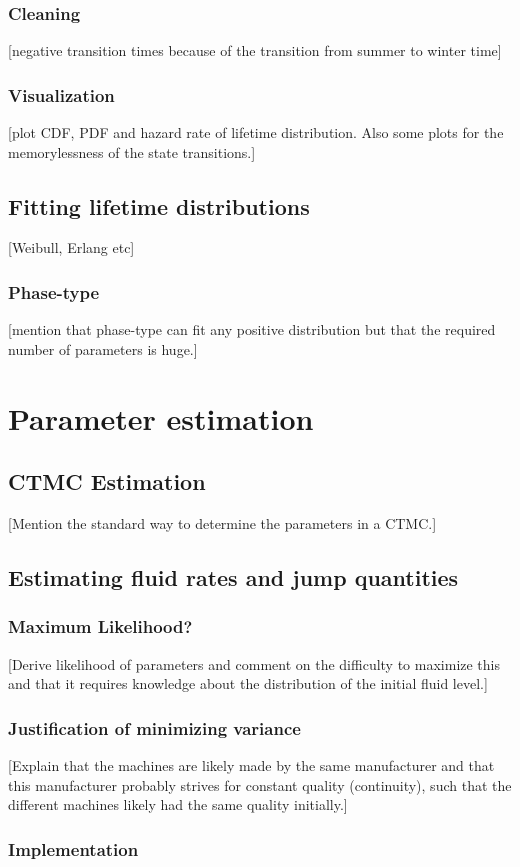 \subsection{Cleaning}
[negative transition times because of the transition from summer to winter time]
\subsection{Visualization}
[plot CDF, PDF and hazard rate of lifetime distribution. Also some plots for the memorylessness of the state transitions.]
\section{Fitting lifetime distributions}
[Weibull, Erlang etc]
\subsection{Phase-type}
[mention that phase-type can fit any positive distribution but that the required number of parameters is huge.]

\chapter{Parameter estimation}
\section{CTMC Estimation}
[Mention the standard way to determine the parameters in a CTMC.]
\section{Estimating fluid rates and jump quantities}
\subsection{Maximum Likelihood?}
[Derive likelihood of parameters and comment on the difficulty to maximize this and that it requires knowledge about the distribution of the initial fluid level.]
\subsection{Justification of minimizing variance}
[Explain that the machines are likely made by the same manufacturer and that this manufacturer probably strives for constant quality (continuity), such that the different machines likely had the same quality initially.]
\subsection{Implementation}
